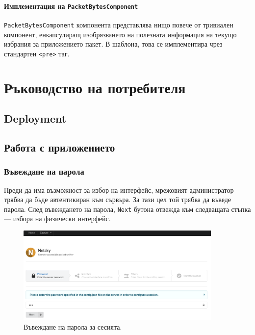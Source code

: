 \documentclass[12pt,a4paper,oneside]{book}
\begin{document}
\subsubsection{Имплементация на \texttt{PacketBytesComponent}}

\texttt{PacketBytesComponent} компонента представлява нищо повече от тривиален
компонент, енкапсулиращ изобрязването на полезната информация на текущо избрания
за приложението пакет. В шаблона, това се имплементира чрез стандартен
\texttt{<pre>} таг.

\chapter{Ръководство на потребителя}

\section{Deployment}

\section{Работа с приложението}

\subsection{Въвеждане на парола}

Преди да има възможност за избор на интерфейс, мрежовият администратор
трябва да бъде автентикиран към сървъра. За тази цел той трябва да въведе парола.
След въвеждането на парола, \texttt{Next} бутона отвежда към следващата стъпка ---
избора на физически интерфейс.

\begin{figure}[h!]
  \centering
  \includegraphics[width=0.9\textwidth]{figures/screenshots/password.png}
  \caption{Въвеждане на парола за сесията.}
  \label{screenshots_password_fig}
\end{figure}
\end{document}
